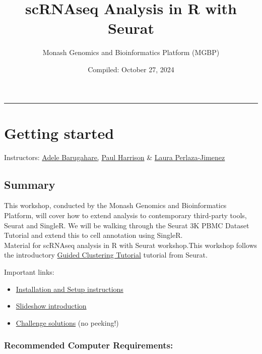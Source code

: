 \documentclass[
]{book}
\title{scRNAseq Analysis in R with Seurat}
\author{Monash Genomics and Bioinformatics Platform (MGBP)}
\date{Compiled: October 27, 2024}
\providecommand{\tightlist}{%
  \setlength{\itemsep}{0pt}\setlength{\parskip}{0pt}}
\begin{document}
\maketitle

{
\setcounter{tocdepth}{1}
\tableofcontents
}
\begin{center}\rule{0.5\linewidth}{0.5pt}\end{center}

\chapter{Getting started}\label{getting-started}

Instructors: \href{https://www.monash.edu/researchinfrastructure/bioinformatics/about/people}{Adele Barugahare,} \href{https://www.monash.edu/researchinfrastructure/bioinformatics/about/people}{Paul Harrison} \& \href{https://www.monash.edu/researchinfrastructure/bioinformatics/about/people}{Laura Perlaza-Jimenez}

\section{Summary}\label{summary}

This workshop, conducted by the Monash Genomics and Bioinformatics Platform, will cover how to extend analysis to contemporary third-party tools, Seurat and SingleR. We will be walking through the Seurat 3K PBMC Dataset Tutorial and extend this to cell annotation using SingleR.\\
Material for scRNAseq analysis in R with Seurat workshop.This workshop follows the introductory \href{https://satijalab.org/seurat/articles/pbmc3k_tutorial.html}{Guided Clustering Tutorial} tutorial from Seurat.

Important links:

\begin{itemize}
\tightlist
\item
  \href{set-up.html}{Installation and Setup instructions}
\item
  \href{../slides}{Slideshow introduction}
\item
  \href{solutions.html}{Challenge solutions} (no peeking!)
\end{itemize}

\subsection{Recommended Computer Requirements:}\label{recommended-computer-requirements}
\end{document}
